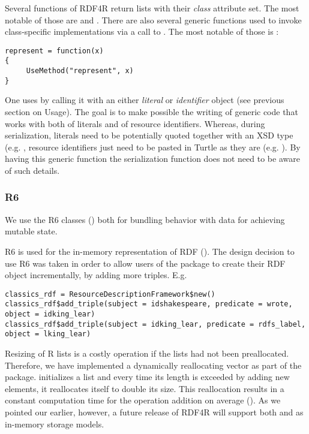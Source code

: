 Several functions of RDF4R return lists with their \emph{class} attribute set. The most notable of those are  and . There are also several generic functions used to invoke class-specific implementations via a call to . The most notable of those is :

\begin{lstlisting}[style=customr]
represent = function(x)
{
     UseMethod("represent", x)
}
\end{lstlisting}

One uses  by calling it with an either \emph{literal} or \emph{identifier} object (see previous section on Usage). The goal is to make possible the writing of generic code that works with both of literals and of resource identifiers. Whereas, during serialization, literals need to be potentially quoted together with an XSD type (e.g. , resource identifiers just need to be pasted in Turtle as they are (e.g. ). By having this generic function the serialization function does not need to be aware of such details.

\subsubsection{R6}

We use the R6 classes (\cite{chang_r6:_2017}) both for bundling behavior with data for achieving mutable state.

R6 is used for the in-memory representation of RDF (). The design decision to use R6 was taken in order to allow users of the package to create their RDF object incrementally, by adding more triples. E.g.

\begin{lstlisting}[style=customr]
classics_rdf = ResourceDescriptionFramework$new()
classics_rdf$add_triple(subject = idshakespeare, predicate = wrote, object = idking_lear)
classics_rdf$add_triple(subject = idking_lear, predicate = rdfs_label, object = lking_lear)
\end{lstlisting}

Resizing of R lists is a costly operation if the lists had not been preallocated. Therefore, we have implemented a dynamically reallocating vector  as part of the package.  initializes a list and every time its length is exceeded by adding new elements, it reallocates itself to double its size. This reallocation results in a constant computation time for the operation addition on average (\cite{harrington_amortizing_2018}). As we pointed our earlier, however, a future release of RDF4R will support both  and  as in-memory storage models.

